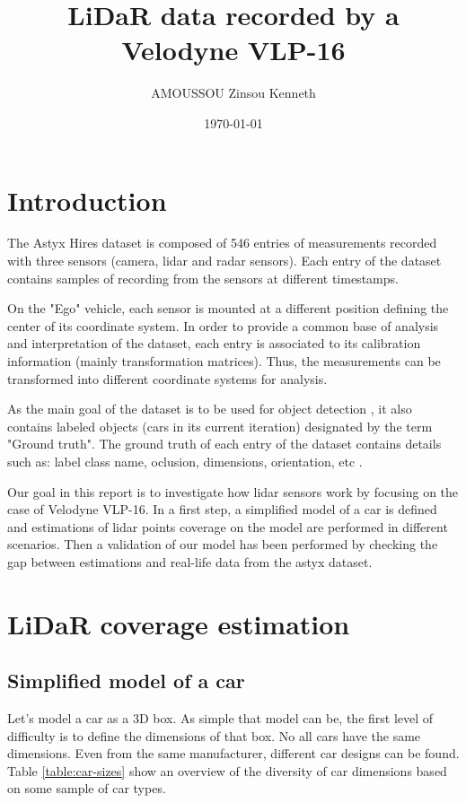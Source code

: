 \documentclass{scrartcl}
\title{LiDaR data recorded by a Velodyne VLP-16}
\author{AMOUSSOU Zinsou Kenneth}
\date{\today}
\begin{document}
	\maketitle
	\tableofcontents

	\clearpage
  
  \section{Introduction}

  The Astyx Hires dataset \cite{astyx} is composed of 546 entries of
  measurements recorded with three sensors (camera, lidar and radar sensors).
  Each entry of the dataset contains samples of recording from the sensors at
  different timestamps.

  On the "Ego" vehicle, each sensor is mounted at a different position
  defining the center of its coordinate system.
  In order to provide a common base of analysis and interpretation of the
  dataset, each entry is associated to its calibration information
  (mainly transformation matrices). Thus, the measurements can be transformed
  into different coordinate systems for analysis.

  As the main goal of the dataset is to be used for object detection
  \cite{astyx}, it also contains labeled objects (cars in its current
  iteration) designated by the term "Ground truth". The ground truth of each
  entry of the dataset contains details such as: label class name, oclusion,
  dimensions, orientation, etc \cite{astyx-spec}.

  Our goal in this report is to investigate how lidar sensors work by focusing
  on the case of Velodyne VLP-16. In a first step, a simplified model of a car
  is defined and estimations of lidar points coverage on the model are
  performed in different scenarios. Then a validation of our model has been  
  performed by checking the gap between estimations and real-life data from the
  astyx dataset.

  \section{LiDaR coverage estimation}
    \subsection{Simplified model of a car}

    Let's model a car as a 3D box. As simple that model can be, the first level
    of difficulty is to define the dimensions of that box. No all cars have the
    same dimensions. Even from the same manufacturer, different car designs
    can be found.
    Table \ref{table:car-sizes} show an overview of the diversity of car
    dimensions based on some sample of car types.
\end{document}

